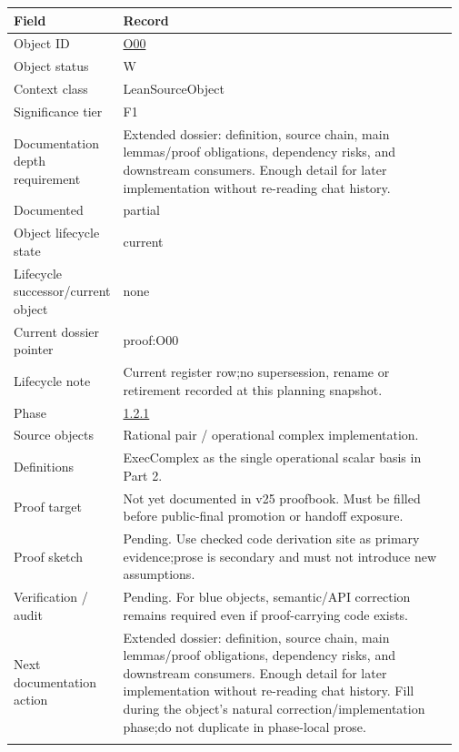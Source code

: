 \begin{longtable}{L{0.16\linewidth} L{0.81\linewidth}}
\hline
\textbf{Field} & \textbf{Record}\\
\hline
Object ID & \hyperlink{object-row-O00}{O00}\\
\hline\addlinespace[0.20em]
Object status & W\\
\hline\addlinespace[0.20em]
Context class & LeanSourceObject\\
\hline\addlinespace[0.20em]
Significance tier & F1\\
\hline\addlinespace[0.20em]
Documentation depth requirement & Extended dossier: definition, source chain, main lemmas/\allowbreak{}proof obligations, dependency risks, and downstream consumers. Enough detail for later implementation without re-reading chat history.\\
\hline\addlinespace[0.20em]
Documented & partial\\
\hline\addlinespace[0.20em]
Object lifecycle state & current\\
\hline\addlinespace[0.20em]
Lifecycle successor/\allowbreak{}current object & none\\
\hline\addlinespace[0.20em]
Current dossier pointer & proof:O00\\
\hline\addlinespace[0.20em]
Lifecycle note & Current register row;\newline no supersession, rename or retirement recorded at this planning snapshot.\\
\hline\addlinespace[0.20em]
Phase & \hyperlink{phase-row-1-2-1}{1.2.1}\\
\hline\addlinespace[0.20em]
Source objects & Rational pair /\allowbreak{} operational complex implementation.\\
\hline\addlinespace[0.20em]
Definitions & ExecComplex as the single operational scalar basis in Part 2.\\
\hline\addlinespace[0.20em]
Proof target & Not yet documented in v25 proofbook. Must be filled before public-final promotion or handoff exposure.\\
\hline\addlinespace[0.20em]
Proof sketch & Pending. Use checked code derivation site as primary evidence;\newline prose is secondary and must not introduce new assumptions.\\
\hline\addlinespace[0.20em]
Verification /\allowbreak{} audit & Pending. For blue objects, semantic/\allowbreak{}API correction remains required even if proof-carrying code exists.\\
\hline\addlinespace[0.20em]
Next documentation action & Extended dossier: definition, source chain, main lemmas/\allowbreak{}proof obligations, dependency risks, and downstream consumers. Enough detail for later implementation without re-reading chat history. Fill during the object's natural correction/\allowbreak{}implementation phase;\newline do not duplicate in phase-local prose.\\
\hline\addlinespace[0.20em]
\end{longtable}
